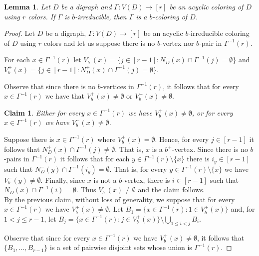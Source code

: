 \documentclass[12pt]{article}
\newtheorem{lemma}[theorem]{Lemma}
\newtheorem{claim}[theorem]{Claim}
\begin{document}
\begin{lemma}\label{existe} Let $D$ be a digraph and $\Gamma: V(D)\rightarrow [r]$ be an acyclic coloring of $D$ using $r$ colors. If $\Gamma$ is $b$-irreducible, then $\Gamma$ is a $b$-coloring of $D$.
\end{lemma}
\begin{proof}  Let $D$ be a digraph, $\Gamma: V(D)\rightarrow [r]$ be an acyclic $b$-irreducible coloring of $D$ using $r$ colors and let us suppose there is no $b$-vertex nor $b$-pair in $\Gamma^{-1}(r)$.

For each $x\in \Gamma^{-1}(r)$ let  $V^-_b(x) = \{j\in[r-1] : N_D^-(x)\cap \Gamma^{-1}(j) = \emptyset\}$ and 
 $V^+_b(x) = \{j\in[r-1] : N_D^+(x)\cap  \Gamma^{-1}(j) = \emptyset\}$.

Observe that since there is no  $b$-vertices in $\Gamma^{-1}(r)$, it follows that for every $x\in \Gamma^{-1}(r)$ we have that $V^+_b(x) \not= \emptyset$ or $V^-_b(x) \not= \emptyset$.
 
\begin{claim} Either for every $x\in \Gamma^{-1}(r)$ we have $V^+_b(x) \not= \emptyset$, or for every $x\in \Gamma^{-1}(r)$ we have $V^-_b(x) \not= \emptyset$. \end{claim}
 
 \noindent Suppose there is $x\in \Gamma^{-1}(r)$ where $V^+_b(x) = \emptyset$. Hence, for every $j\in[r-1]$ it follows that  $N_D^+(x)\cap \Gamma^{-1}(j) \not= \emptyset$. That is, $x$ is a $b^+$-vertex. Since there is no $b$-pairs in $\Gamma^{-1}(r)$ it follows that for each $y\in \Gamma^{-1}(r)\setminus\{x\}$  there is  $i_y\in[r-1]$ such that   $N_D^-(y)\cap \Gamma^{-1}(i_y)= \emptyset$. That is, for every $y\in \Gamma^{-1}(r)\setminus\{x\}$ we have 
  $V^-_b(y) \not= \emptyset$. Finally, since $x$ is not a $b$-vertex, there is $i\in[r-1]$ such that   $N_D^-(x)\cap \Gamma^{-1}(i) = \emptyset$. Thus  $V^-_b(x) \not= \emptyset$ and the claim follows.\\

 By the previous claim, without loss of generality, we suppose that for every $x\in \Gamma^{-1}(r)$ we have $V^+_b(x) \not= \emptyset$.
 Let  $B_1 = \{x\in \Gamma^{-1}(r) : 1\in V^+_b(x)\}$ and, for $1< j\leq r-1$, let  
 $B_j = \{x\in \Gamma^{-1}(r) : j\in V^+_b(x)\}\setminus\bigcup\limits_{1\leq i<j} B_i$. 

 Observe that since for every $x\in \Gamma^{-1}(r)$ we have $V^+_b(x) \not= \emptyset$, it follows that $\{B_1, \dots, B_{r-1}\}$ is a set of pairwise disjoint sets whose union is  $\Gamma^{-1}(r)$.


\end{proof}
\end{document}
